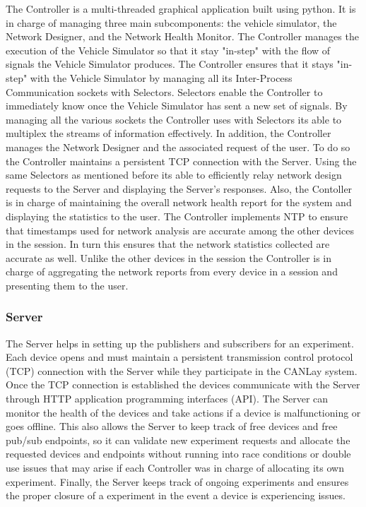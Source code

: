 \documentclass[letterpaper,twocolumn,10pt]{article}
\begin{document}
The Controller is a multi-threaded graphical application built using python. It is in charge of managing three main subcomponents: the vehicle simulator, the Network Designer, and the Network Health Monitor. The Controller manages the execution of the Vehicle Simulator so that it stay "in-step" with the flow of signals the Vehicle Simulator produces. The Controller ensures that it stays "in-step" with the Vehicle Simulator by managing all its Inter-Process Communication sockets with Selectors. Selectors enable the Controller to immediately know once the Vehicle Simulator has sent a new set of signals. By managing all the various sockets the Controller uses with Selectors its able to multiplex the streams of information effectively. In addition, the Controller manages the Network Designer and the associated request of the user. To do so the Controller maintains a persistent TCP connection with the Server. Using the same Selectors as mentioned before its able to efficiently relay network design requests to the Server and displaying the Server's responses. Also, the Contoller is in charge of maintaining the overall network health report for the system and displaying the statistics to the user. The Controller implements NTP to ensure that timestamps used for network analysis are accurate among the other devices in the session. In turn this ensures that the network statistics collected are accurate as well. Unlike the other devices in the session the Controller is in charge of aggregating the network reports from every device in a session and presenting them to the user.

\subsubsection{Server}
The Server helps in setting up the publishers and subscribers for an experiment. Each device opens and must maintain a persistent transmission control protocol (TCP) connection with the Server while they participate in the CANLay system. Once the TCP connection is established the devices communicate with the Server through HTTP application programming interfaces (API). The Server can monitor the health of the devices and take actions if a device is malfunctioning or goes offline. This also allows the Server to keep track of free devices and free pub/sub endpoints, so it can validate new experiment requests and allocate the requested devices and endpoints without running into race conditions or double use issues that may arise if each Controller was in charge of allocating its own experiment. Finally, the Server keeps track of ongoing experiments and ensures the proper closure of a experiment in the event a device is experiencing issues.
\end{document}
